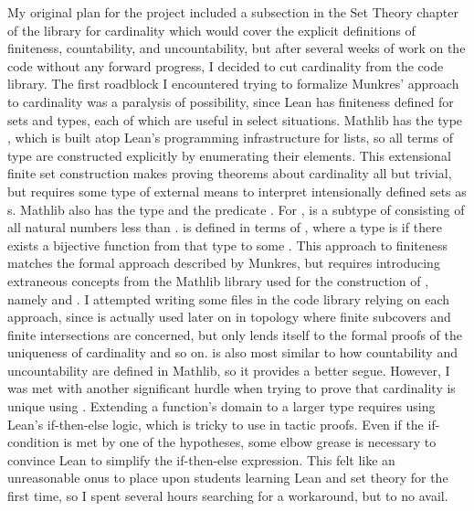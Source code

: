 My original plan for the project
included a subsection in the Set Theory chapter of the library for
cardinality which would cover the explicit definitions of finiteness, 
countability, and uncountability, but after several weeks of work on 
the code without any forward progress, I decided to cut cardinality
from the code library. The first roadblock I encountered trying to
formalize Munkres' approach to cardinality was a paralysis of possibility, 
since Lean has finiteness defined for sets and types, each of which are
useful in select situations. Mathlib has the type , which is 
built atop Lean's programming infrastructure for lists, so all terms 
of type  are constructed explicitly by enumerating their 
elements. This extensional finite set construction makes proving theorems about
cardinality all but trivial, but requires some type of external means
to interpret intensionally defined sets as s. Mathlib also 
has the type  and the 
predicate . For , 
 is a subtype of  consisting of all natural numbers
less than .  is defined in terms of , where
a type is  if there exists a bijective function from
that type to some . This approach to finiteness matches the formal
approach described by Munkres, but requires introducing extraneous concepts
from the Mathlib library used for the construction of , namely
 and . I attempted writing some files in the code
library relying on each approach, since  is actually used 
later on in topology where finite subcovers and finite intersections are 
concerned, but only  lends itself to the formal proofs of
the uniqueness of cardinality and so on.  is also most similar
to how countability and uncountability are defined in Mathlib, so it provides
a better segue. However, I was met with another significant hurdle when trying
to prove that cardinality is unique using . Extending a function's 
domain to a larger type requires using Lean's if-then-else logic, which
is tricky to use in tactic proofs. Even if the if-condition is met by 
one of the hypotheses, some elbow grease is necessary to convince Lean to
simplify the if-then-else expression. This felt like an unreasonable onus 
to place upon students learning Lean and set theory for the first time, so 
I spent several hours searching for a workaround, but to no avail. 

